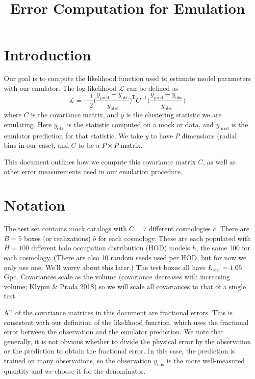 \documentclass[12pt]{article}
\title{Error Computation for Emulation}
\newcommand{\T}{^{\mathrm{T}}}
\newcommand{\inv}{^{-1}}
\newcommand{\cov}[1]{C^\text{#1}}
\newcommand{\covtot}{C}
\newcommand{\y}[1]{y_{\text{#1}}}
\begin{document}
\maketitle


\section{Introduction}

Our goal is to compute the likelihood function used to estimate model parameters with our emulator.
The log-likelihood $\mathcal{L}$ can be defined as 
\begin{equation}
    \mathcal{L} = -\frac{1}{2} \bigg( \frac{\y{pred} - \y{obs}}{\y{obs}} \bigg)\T \covtot\inv \bigg( \frac{\y{pred} - \y{obs}}{\y{obs}} \bigg)
\end{equation}
where $\covtot$ is the covariance matrix, and $y$ is the clustering statistic we are emulating.
Here $\y{obs}$ is the statistic computed on a mock or data, and $\y{pred}$ is the emulator prediction for that statistic. 
We take $y$ to have $P$ dimensions (radial bins in our case), and $C$ to be a $P \times P$ matrix.

This document outlines how we compute this covariance matrix $\covtot$, as well as other error measurements used in our emulation procedure.

\section{Notation}
 
The test set contains mock catalogs with $C=7$ different cosmologies $c$. 
There are $B=5$ boxes (or realizations) $b$ for each cosmology. 
These are each populated with $H=100$ different halo occupation distribution (HOD) models $h$, the same 100 for each cosmology. 
(There are also 10 random seeds used per HOD, but for now we only use one. We'll worry about this later.)
The test boxes all have $L_\text{test}=1.05$ Gpc.
Covariances scale as the volume (covariance decreases with increasing volume; Klypin \& Prada 2018) so we will scale all covariances to that of a single test

All of the covariance matrices in this document are fractional errors.
This is consistent with our definition of the likelihood function, which uses the fractional error between the observation and the emulator prediction.
We note that generally, it is not obvious whether to divide the physical error by the observation or the prediction to obtain the fractional error.
In this case, the prediction is trained on many observations, so the observation $\y{obs}$ is the more well-measured quantity and we choose it for the denominator.
\end{document}
